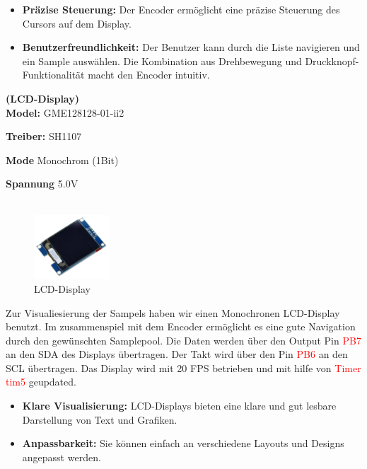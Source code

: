 \begin{itemize}
	\item \textbf{Präzise Steuerung:} Der Encoder ermöglicht eine präzise Steuerung des Cursors auf dem Display.
	
	\item \textbf{Benutzerfreundlichkeit:} Der Benutzer kann durch die Liste navigieren und ein Sample auswählen. Die Kombination aus Drehbewegung und Druckknopf-Funktionalität macht den Encoder intuitiv.  
\end{itemize}

\vspace{3em}

\textbf{(LCD-Display)} \\

\textbf{Model:} GME128128-01-ii2

\textbf{Treiber:} SH1107

\textbf{Mode} Monochrom (1Bit)

\textbf{Spannung} 5.0V \\ \\

	\begin{figure} %
	\vspace{-160pt + 0.02\textwidth}
	\hspace{0.07\textwidth} %
	\includegraphics[width=0.25\textwidth]{images/05_technische_spezifikation/Interface/Display.png} %
	\caption{LCD-Display}
	\label{fig:lcd_display}
	\vspace{-20pt}
\end{figure}


Zur Visualiesierung der Sampels haben wir einen Monochronen LCD-Display benutzt. Im zusammenspiel mit dem Encoder ermöglicht es eine gute Navigation durch den gewünschten Samplepool. Die Daten werden über den Output Pin  \textcolor{red}{PB7} an den SDA des Displays übertragen. Der Takt wird über den Pin  \textcolor{red}{PB6} an den SCL übertragen. Das Display wird mit 20 FPS betrieben und mit hilfe von \textcolor{red}{Timer tim5} geupdated.

\begin{itemize}
	\item \textbf{Klare Visualisierung:} LCD-Displays bieten eine klare und gut lesbare Darstellung von Text und Grafiken.
	\item \textbf{Anpassbarkeit:} Sie können einfach an verschiedene Layouts und Designs angepasst werden.
\end{itemize}

